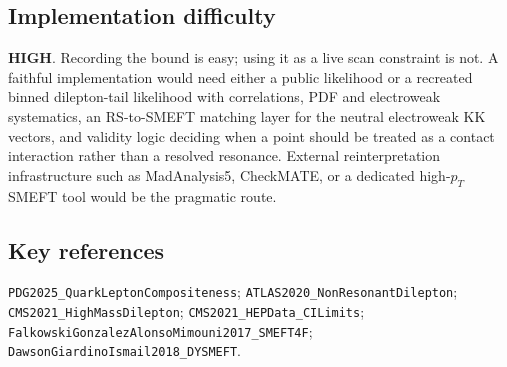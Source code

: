 \subsection*{Implementation difficulty}
\textbf{HIGH}.  Recording the bound is easy; using it as a live scan
constraint is not.  A faithful implementation would need either a public
likelihood or a recreated binned dilepton-tail likelihood with correlations,
PDF and electroweak systematics, an RS-to-SMEFT matching layer for the
neutral electroweak KK vectors, and validity logic deciding when a point
should be treated as a contact interaction rather than a resolved resonance.
External reinterpretation infrastructure such as MadAnalysis5, CheckMATE, or
a dedicated high-\(p_T\) SMEFT tool would be the pragmatic route.

\subsection*{Key references}
\texttt{PDG2025\_QuarkLeptonCompositeness};
\texttt{ATLAS2020\_NonResonantDilepton};
\texttt{CMS2021\_HighMassDilepton};
\texttt{CMS2021\_HEPData\_CILimits};
\texttt{FalkowskiGonzalezAlonsoMimouni2017\_SMEFT4F};
\texttt{DawsonGiardinoIsmail2018\_DYSMEFT}.
